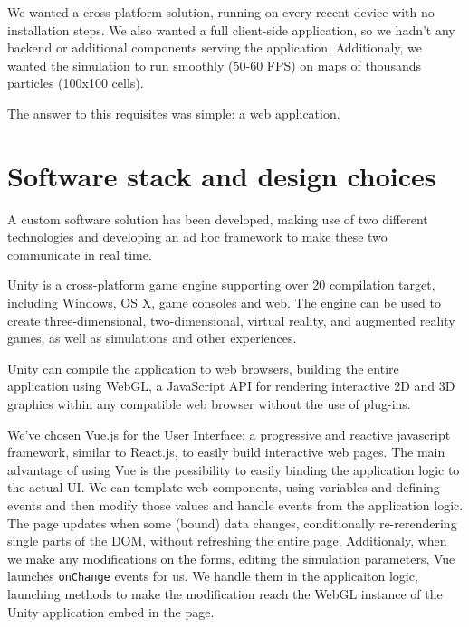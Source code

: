 We wanted a cross platform solution, running on every recent device with no installation steps.
We also wanted a full client-side application, so we hadn't any backend or additional components serving the application. Additionaly, we wanted the simulation to run smoothly (50-60 FPS) on maps of thousands particles (100x100 cells).

The answer to this requisites was simple: a web application.

\section{Software stack and design choices}

A custom software solution has been developed, making use of two different technologies and developing an ad hoc framework to make these two communicate in real time.

Unity is a cross-platform game engine supporting over 20 compilation target, including Windows, OS X, game consoles and web. The engine can be used to create three-dimensional, two-dimensional, virtual reality, and augmented reality games, as well as simulations and other experiences.

Unity can compile the application to web browsers, building the entire application using WebGL, a JavaScript API for rendering interactive 2D and 3D graphics within any compatible web browser without the use of plug-ins.

We've chosen Vue.js for the User Interface: a progressive and reactive javascript framework, similar to React.js, to easily build interactive web pages. The main advantage of using Vue is the possibility to easily binding the application logic to the actual UI. We can template web components, using variables and defining events and then modify those values and handle events from the application logic. The page updates when some (bound) data changes, conditionally re-rerendering single parts of the DOM, without refreshing the entire page. Additionaly, when we make any modifications on the forms, editing the simulation parameters, Vue launches \texttt{onChange} events for us. We handle them in the applicaiton logic, launching methods to make the modification reach the WebGL instance of the Unity application embed in the page.

